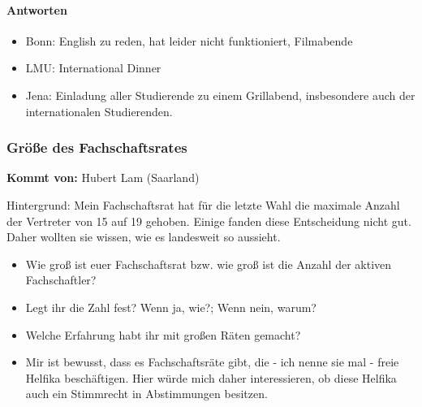       \paragraph{Antworten}
        \begin{itemize}
          \item Bonn: English zu reden, hat leider nicht funktioniert, Filmabende
          \item LMU: International Dinner
          \item Jena: Einladung aller Studierende zu einem Grillabend, insbesondere auch der internationalen Studierenden.
        \end{itemize}

    \subsubsection*{Größe des Fachschaftsrates}
      \textbf{Kommt von:} Hubert Lam (Saarland)

      Hintergrund: Mein Fachschaftsrat hat für die letzte Wahl die maximale Anzahl der Vertreter von 15 auf 19 gehoben. Einige fanden diese Entscheidung nicht gut. Daher wollten sie wissen, wie es landesweit so aussieht. \\

      \begin{itemize}
        \item Wie groß ist euer Fachschaftsrat bzw. wie groß ist die Anzahl der aktiven Fachschaftler?
        \item Legt ihr die Zahl fest? Wenn ja, wie?; Wenn nein, warum?
        \item Welche Erfahrung habt ihr mit großen Räten gemacht?
        \item Mir ist bewusst, dass es Fachschaftsräte gibt, die - ich nenne sie mal - freie Helfika beschäftigen. Hier würde mich daher interessieren, ob diese Helfika auch ein Stimmrecht in Abstimmungen besitzen.
      \end{itemize}

